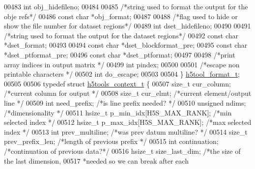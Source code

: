 \begin{DoxyCode}
{{{{{{{{{{{{{{{{{{{00483     \textcolor{keywordtype}{int} obj\_hidefileno;
00484 
00485     \textcolor{comment}{/*string used to format the output for the obje refs*/}
00486     \textcolor{keyword}{const} \textcolor{keywordtype}{char} *obj\_format;
00487 
00488     \textcolor{comment}{/*flag used to hide or show the file number for dataset regions*/}
00489     \textcolor{keywordtype}{int} dset\_hidefileno;
00490 
00491     \textcolor{comment}{/*string used to format the output for the dataset regions*/}
00492     \textcolor{keyword}{const} \textcolor{keywordtype}{char} *dset\_format;
00493 
00494     \textcolor{keyword}{const} \textcolor{keywordtype}{char} *dset\_blockformat\_pre;
00495     \textcolor{keyword}{const} \textcolor{keywordtype}{char} *dset\_ptformat\_pre;
00496     \textcolor{keyword}{const} \textcolor{keywordtype}{char} *dset\_ptformat;
00497 
00498     \textcolor{comment}{/*print array indices in output matrix */}
00499     \textcolor{keywordtype}{int} pindex;
00500 
00501     \textcolor{comment}{/*escape non printable characters */}
00502     \textcolor{keywordtype}{int} do\_escape;
00503 
00504 \} \hyperlink{structh5tool__format__t}{h5tool\_format\_t};
00505 
00506 \textcolor{keyword}{typedef} \textcolor{keyword}{struct }\hyperlink{structh5tools__context__t}{h5tools\_context\_t} \{
00507     \textcolor{keywordtype}{size\_t} cur\_column;                       \textcolor{comment}{/*current column for output */}
00508     \textcolor{keywordtype}{size\_t} cur\_elmt;                         \textcolor{comment}{/*current element/output line */}
00509     \textcolor{keywordtype}{int}  need\_prefix;                        \textcolor{comment}{/*is line prefix needed? */}
00510     \textcolor{keywordtype}{unsigned} ndims;                          \textcolor{comment}{/*dimensionality  */}
00511     hsize\_t p\_min\_idx[H5S\_MAX\_RANK];         \textcolor{comment}{/*min selected index */}
00512     hsize\_t p\_max\_idx[H5S\_MAX\_RANK];         \textcolor{comment}{/*max selected index */}
00513     \textcolor{keywordtype}{int}  prev\_multiline;                     \textcolor{comment}{/*was prev datum multiline? */}
00514     \textcolor{keywordtype}{size\_t} prev\_prefix\_len;                  \textcolor{comment}{/*length of previous prefix */}
00515     \textcolor{keywordtype}{int}  continuation;                       \textcolor{comment}{/*continuation of previous data?*/}
00516     hsize\_t size\_last\_dim;                   \textcolor{comment}{/*the size of the last dimension,}
00517 \textcolor{comment}{                                              *needed so we can break after each}
}}}}}}}}}}}}}}}}}}}
\end{DoxyCode}
